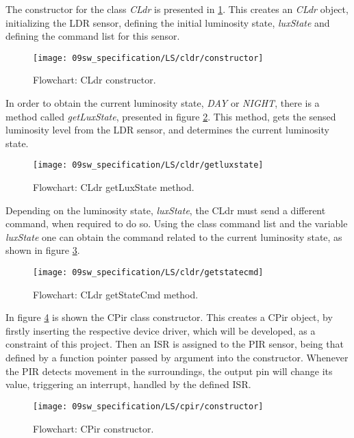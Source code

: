 \clearpage
{}

The constructor for the class \textit{CLdr} is presented in \ref{fig:CLdrconstructor}. This creates an \textit{CLdr} object, initializing the LDR sensor, defining the initial luminosity state, \textit{luxState} and defining the command list for this sensor.

\begin{figure}[H]
	\centering
	\texttt{[image: 09sw\_specification/LS/cldr/constructor]}
	\caption{Flowchart: CLdr constructor.}
	\label{fig:CLdrconstructor}
\end{figure}

\clearpage
In order to obtain the current luminosity state, \textit{DAY} or \textit{NIGHT}, there is a method called \textit{getLuxState}, presented in figure \ref{fig:CLdrgetLuxState}. This method, gets the sensed luminosity level from the LDR sensor, and determines the current luminosity state.

\begin{figure}[H]
	\centering
	\texttt{[image: 09sw\_specification/LS/cldr/getluxstate]}
	\caption{Flowchart: CLdr getLuxState method.}
	\label{fig:CLdrgetLuxState}
\end{figure}

\clearpage
Depending on the luminosity state, \textit{luxState}, the CLdr must send a different command, when required to do so. Using the class command list and the variable \textit{luxState} one can obtain the command related to the current luminosity state, as shown in figure \ref{fig:CLdrgetStateCmd}.

\begin{figure}[H]
	\centering
	\texttt{[image: 09sw\_specification/LS/cldr/getstatecmd]}
	\caption{Flowchart: CLdr getStateCmd method.}
	\label{fig:CLdrgetStateCmd}
\end{figure}

\clearpage
{}

In figure \ref{fig:CPirconstructor} is shown the CPir class constructor. This creates a CPir object, by firstly inserting the respective device driver, which will be developed, as a constraint of this project. Then an ISR is assigned to the PIR sensor, being that defined by a function pointer passed by argument into the constructor. Whenever the PIR detects movement in the surroundings, the output pin will change its value, triggering an interrupt, handled by the defined ISR.

\begin{figure}[H]
	\centering
	\texttt{[image: 09sw\_specification/LS/cpir/constructor]}
	\caption{Flowchart: CPir constructor.}
	\label{fig:CPirconstructor}
\end{figure}


